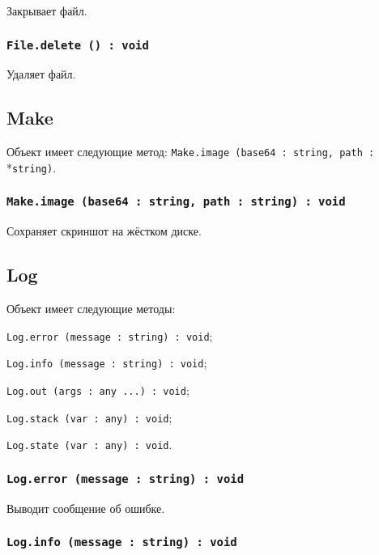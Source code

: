 Закрывает файл.

\subsubsection{\texttt{File.delete () : void}}

Удаляет файл.

\subsection{{\color{orange} Make}}

Объект \make{} имеет следующие метод: \texttt{Make.image (base64 : string, path :}\\*\texttt{string)}.

\subsubsection{\texttt{Make.image (base64 : string, path : string) : void}}

Сохраняет скриншот на жёстком диске.

\subsection{{\color{orange} Log}}

Объект \logtype{} имеет следующие методы:
\begin{icItems}
	\item \texttt{Log.error (message : string) : void};
	\item \texttt{Log.info (message : string) : void};
	\item \texttt{Log.out (args : any ...) : void};
	\item \texttt{Log.stack (var : any) : void};
	\item \texttt{Log.state (var : any) : void}.
\end{icItems}

\subsubsection{\texttt{Log.error (message : string) : void}}

Выводит сообщение об ошибке.

\subsubsection{\texttt{Log.info (message : string) : void}}

